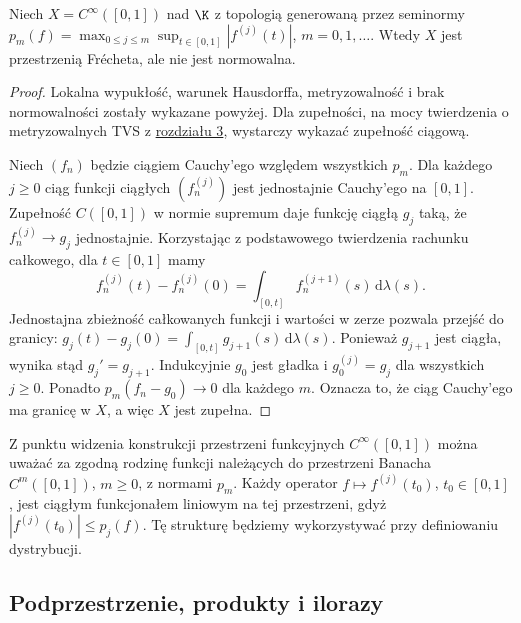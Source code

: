 \begin{twierdzenie}
\label{thm:smooth-complete}
Niech $X=C^\infty([0,1])$ nad $\K$ z topologią generowaną
przez seminormy $p_m(f)=\max_{0\le j\le m}
\sup_{t\in[0,1]}|f^{(j)}(t)|$, $m=0,1,\ldots$.
Wtedy $X$ jest przestrzenią Frécheta, ale nie jest normowalna.
\end{twierdzenie}
\begin{proof}
Lokalna wypukłość, warunek Hausdorffa, metryzowalność
i brak normowalności zostały wykazane powyżej.
Dla zupełności, na mocy twierdzenia o metryzowalnych
TVS z \hyperref[sec:zupelnosc]{rozdziału 3}, wystarczy wykazać zupełność ciągową.

Niech $(f_n)$ będzie ciągiem Cauchy'ego względem wszystkich
$p_m$. Dla każdego $j\ge0$ ciąg funkcji ciągłych
$(f_n^{(j)})$ jest jednostajnie Cauchy'ego na $[0,1]$.
Zupełność $C([0,1])$ w normie supremum daje
funkcję ciągłą $g_j$ taką, że $f_n^{(j)}\to g_j$
jednostajnie. Korzystając z podstawowego twierdzenia
rachunku całkowego, dla $t\in[0,1]$ mamy
\[
 f_n^{(j)}(t)-f_n^{(j)}(0)
 =\int_{[0,t]}f_n^{(j+1)}(s)\,\mathrm d\lambda(s).
\]
Jednostajna zbieżność całkowanych funkcji i wartości
w zerze pozwala przejść do granicy:
$g_j(t)-g_j(0)=\int_{[0,t]}g_{j+1}(s)\,\mathrm d\lambda(s)$.
Ponieważ $g_{j+1}$ jest ciągła, wynika stąd
$g_j'=g_{j+1}$. Indukcyjnie $g_0$ jest gładka i
$g_0^{(j)}=g_j$ dla wszystkich $j\ge0$.
Ponadto $p_m(f_n-g_0)\to0$ dla każdego $m$.
Oznacza to, że ciąg Cauchy'ego ma granicę w $X$,
a więc $X$ jest zupełna.
\end{proof}

\begin{uwaga}
Z punktu widzenia konstrukcji przestrzeni funkcyjnych
$C^\infty([0,1])$ można uważać za zgodną rodzinę
funkcji należących do przestrzeni Banacha $C^m([0,1])$,
$m\ge0$, z normami $p_m$. Każdy operator
$f\mapsto f^{(j)}(t_0)$, $t_0\in[0,1]$, jest ciągłym
funkcjonałem liniowym na tej przestrzeni, gdyż
$|f^{(j)}(t_0)|\le p_j(f)$. Tę strukturę będziemy
wykorzystywać przy definiowaniu dystrybucji.
\end{uwaga}

\subsection{Podprzestrzenie, produkty i ilorazy}

